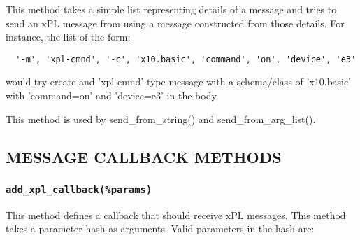 \documentclass[12pt,a4paper]{article}
\begin{document}
This method takes a simple list representing details of a message
and tries to send an xPL message from using a message constructed
from those details.  For instance, the list of the form:

\begin{verbatim}
  '-m', 'xpl-cmnd', '-c', 'x10.basic', 'command', 'on', 'device', 'e3'
\end{verbatim}


would try create and 'xpl-cmnd'-type message with a schema/class of
'x10.basic' with 'command=on' and 'device=e3' in the body.



This method is used by \textsf{send\_from\_string()} and
\textsf{send\_from\_arg\_list()}.

\subsection*{MESSAGE CALLBACK METHODS\label{xPL::Listener_MESSAGE_CALLBACK_METHODS}}
\subsubsection*{\texttt{add\_xpl\_callback(\%params)}\label{xPL::Listener_add_xpl_callback_params_}}


This method defines a callback that should receive xPL messages.
This method takes a parameter hash as arguments.  Valid parameters in
the hash are:
\end{document}
